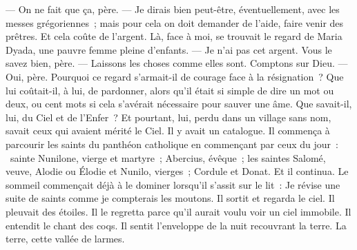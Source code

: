 \pend
%
\pstart
  \guillemotright --- On ne fait que ça, père.
\pend
%
\pstart
  \guillemotright --- Je dirais bien peut-être, éventuellement, avec les messes grégoriennes ; mais pour cela on doit demander de l’aide, faire venir des prêtres. Et cela coûte de l'argent.
\pend
%
\pstart
  \guillemotright Là, face à moi, se trouvait le regard de Maria Dyada, une pauvre femme pleine d’enfants.
\pend
%
\pstart
  \guillemotright --- Je n’ai pas cet argent. Vous le savez bien, père.
\pend
%
\pstart
  \guillemotright --- Laissons les choses comme elles sont. Comptons sur Dieu.
\pend
%
\pstart
  \guillemotright --- Oui, père.\fg{}
\pend
%
\pstart
  Pourquoi ce regard s’armait-il de courage face à la résignation ? Que lui coûtait-il, à lui, de pardonner, alors qu’il était si simple de dire un mot ou deux, ou cent mots si cela s’avérait nécessaire pour sauver une âme. Que savait-il, lui, du Ciel et de l’Enfer ? Et pourtant, lui, perdu dans un village sans nom, savait ceux qui avaient mérité le Ciel. Il y avait un catalogue. Il commença à parcourir les saints du panthéon catholique en commençant par ceux du jour : \og{} sainte Nunilone, vierge et martyre ; Abercius, évêque ; les saintes Salomé, veuve, Alodie ou Élodie et Nunilo, vierges ; Cordule et Donat.\fg{} Et il continua. Le sommeil commençait déjà à le dominer lorsqu’il s’assit sur le lit : \og{}Je révise une suite de saints comme je compterais les moutons.\fg{}
\pend
%
\pstart
  Il sortit et regarda le ciel. Il pleuvait des étoiles. Il le regretta parce qu’il aurait voulu voir un ciel immobile. Il entendit le chant des coqs. Il sentit l’enveloppe de la nuit recouvrant la terre. La terre, \og{}cette vallée de larmes\fg{}.
\pend
